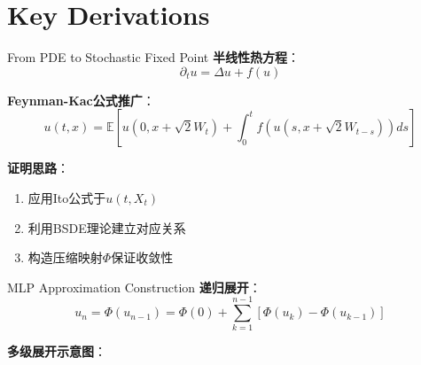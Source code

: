 \documentclass[aspectratio=169]{beamer}
\begin{document}
	\section{Key Derivations}
	\begin{frame}{From PDE to Stochastic Fixed Point}
		\textbf{半线性热方程}：
		\[
		\partial_t u = \Delta u + f(u)
		\]

		\textbf{Feynman-Kac公式推广}：
		\[
		u(t,x) = \mathbb{E}\left[ u(0,x+\sqrt{2}W_t) + \int_0^t f(u(s,x+\sqrt{2}W_{t-s}))ds \right]
		\]

		\textbf{证明思路}：
		\begin{enumerate}
			\item 应用Ito公式于$u(t,X_t)$
			\item 利用BSDE理论建立对应关系
			\item 构造压缩映射$\Phi$保证收敛性
		\end{enumerate}
	\end{frame}

	\begin{frame}{MLP Approximation Construction}
		\textbf{递归展开}：
		\[
		u_n = \Phi(u_{n-1}) = \Phi(0) + \sum_{k=1}^{n-1} [\Phi(u_k) - \Phi(u_{k-1})]
		\]

		\textbf{多级展开示意图}：
	\end{frame}

	\iffalse
\end{document}
